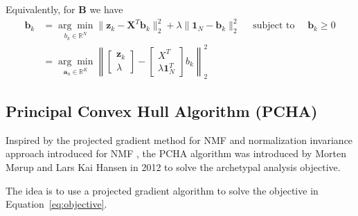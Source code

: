 \documentclass[oneside]{article}
\begin{document}
Equivalently, for $\mathbf{B}$ we have
\begin{equation}
\begin{aligned}
\mathbf{b}_k &= \underset{b_k \in \mathbb{R}^N}{\arg \min} \|\mathbf{z}_k - \mathbf{X}^T \mathbf{b}_k\|_2^2 + \lambda \| \mathbf{1}_N - \mathbf{b}_k \|_2^2 \quad \text{ subject to } \quad \mathbf{b}_k \geq 0 \\
&= \underset{\mathbf{a}_n \in \mathbb{R}^K}{\arg \min} \left\| \begin{bmatrix} \mathbf{z}_k \\ \lambda \end{bmatrix} -  \begin{bmatrix} X^T \\ \lambda \mathbf{1}_N^T \end{bmatrix} b_k \right\|_2^2
\end{aligned}
\end{equation}

\subsection{Principal Convex Hull Algorithm (PCHA)}

Inspired by the projected gradient method for NMF \autocite{linProjectedGradientMethods2007} and normalization invariance approach introduced for NMF \autocite{eggertSparseCodingNMF2004}, the PCHA algorithm was introduced by Morten Mørup and Lars Kai Hansen in 2012 to solve the archetypal analysis objective. 

The idea is to use a projected gradient algorithm to solve the objective in Equation~\eqref{eq:objective}.
\end{document}
